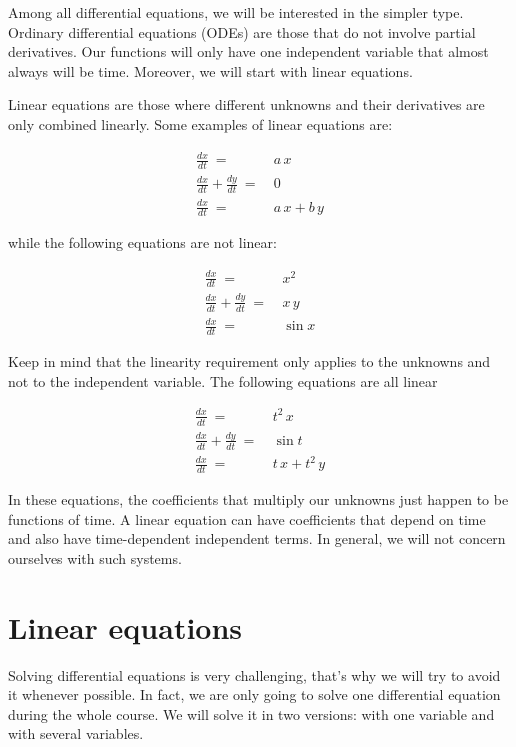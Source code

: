 \documentclass{tufte-book} %
\begin{document}
Among all differential equations, we will be interested in the simpler type. Ordinary differential equations (ODEs) are those that do not involve partial derivatives. Our functions will only have one independent variable that almost always will be time. Moreover, we will start with linear equations.

Linear equations are those where different unknowns and their derivatives are only combined linearly. Some examples of linear equations are:

\begin{align}
	\frac{dx}{dt} \: = \: &  a \, x	\nonumber\\
	\frac{dx}{dt} + \frac{dy}{dt}\: = \: &  0 \nonumber\\
	\frac{dx}{dt} \: = \: &  a \, x + b \, y \nonumber
\end{align}

while the following equations are not linear:

\begin{align}
	\frac{dx}{dt} \: = \: &  x^2	\nonumber\\
	\frac{dx}{dt} + \frac{dy}{dt}\: = \: &  x \, y \nonumber\\
	\frac{dx}{dt} \: = \: &  \sin x \nonumber
\end{align}

Keep in mind that the linearity requirement only applies to the unknowns and not to the independent variable. The following equations are all linear


\begin{align}
	\frac{dx}{dt} \: = \: &  t^2 \, x	\nonumber\\
	\frac{dx}{dt} + \frac{dy}{dt}\: = \: &  \sin t \nonumber\\
	\frac{dx}{dt} \: = \: &  t \, x + t^2 \, y \nonumber
\end{align}

In these equations, the coefficients that multiply our unknowns just happen to be functions of time. A linear equation can have coefficients that depend on time and also have time-dependent independent terms. In general, we will not concern ourselves with such systems.

\section{Linear equations}

Solving differential equations is very challenging, that's why we will try to avoid it whenever possible. In fact, we are only going to solve one differential equation during the whole course. We will solve it in two versions: with one variable and with several variables.
\end{document}
